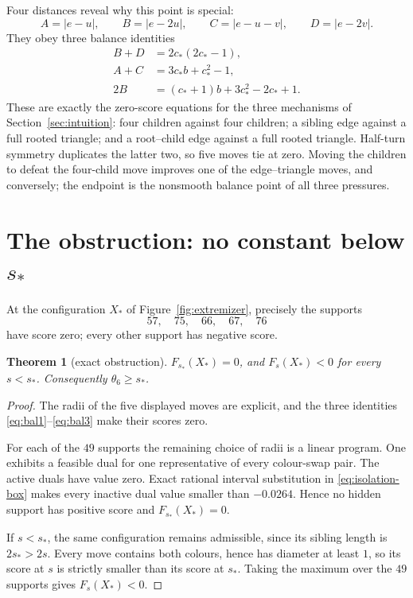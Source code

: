 \documentclass[11pt]{article}
\theoremstyle{plain}
\newtheorem{theorem}{Theorem}[section]
\theoremstyle{definition}
\theoremstyle{remark}
\newcommand{\sstar}{s_{\!*}}
\newcommand{\cstar}{c_{\!*}}
\begin{document}
Four distances reveal why this point is special:
\[
 A=|e-u|,\qquad B=|e-2u|,\qquad C=|e-u-v|,\qquad D=|e-2v|.
\]
They obey three balance identities
\begin{align}
 B+D&=2\cstar(2\cstar-1),\label{eq:bal1}\\
 A+C&=3\cstar b+\cstar^2-1,\label{eq:bal2}\\
 2B&=(\cstar+1)b+3\cstar^2-2\cstar+1.\label{eq:bal3}
\end{align}
These are exactly the zero-score equations for the three mechanisms of
Section~\ref{sec:intuition}: four children against four children; a sibling
edge against a full rooted triangle; and a root--child edge against a full
rooted triangle.  Half-turn symmetry duplicates the latter two, so five
moves tie at zero.  Moving the children to defeat the four-child move
improves one of the edge--triangle moves, and conversely; the endpoint is
the nonsmooth balance point of all three pressures.

\section{The obstruction: no constant below \texorpdfstring{$\sstar$}{s*}}
\label{sec:obstruction}

At the configuration $X_*$ of Figure~\ref{fig:extremizer}, precisely the
supports
\[
 57,\quad 75,\quad 66,\quad 67,\quad 76
\]
have score zero; every other support has negative score.

\begin{theorem}[exact obstruction]\label{thm:obstruction}
$F_{\sstar}(X_*)=0$, and $F_s(X_*)<0$ for every $s<\sstar$.  Consequently
$\theta_6\ge\sstar$.
\end{theorem}

\begin{proof}
The radii of the five displayed moves are explicit, and the three
identities \eqref{eq:bal1}--\eqref{eq:bal3} make their scores zero.

For each of the $49$ supports the remaining choice of radii is a linear
program.  One exhibits a feasible dual for one representative of every
colour-swap pair.  The active duals have value zero.  Exact rational
interval substitution in \eqref{eq:isolation-box} makes every inactive dual
value smaller than $-0.0264$.  Hence no hidden support has positive score
and $F_{\sstar}(X_*)=0$.

If $s<\sstar$, the same configuration remains admissible, since its sibling
length is $2\sstar>2s$.  Every move contains both colours, hence has
diameter at least $1$, so its score at $s$ is strictly smaller than its
score at $\sstar$.  Taking the maximum over the $49$ supports gives
$F_s(X_*)<0$.
\end{proof}
\end{document}
